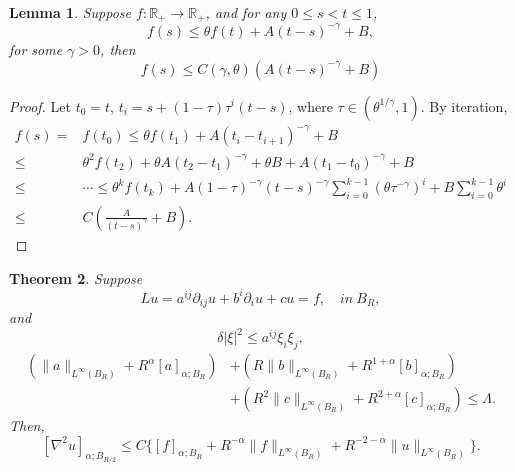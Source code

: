 \documentclass[twoside, 12pt]{book}
\numberwithin{equation}{chapter}
\newtheorem{theorem}{Theorem}[section]
\newtheorem{lemma}[theorem]{Lemma}
\def\mR{{\mathbb R}}
\def\leq{\leqslant}
\def\p{\partial}
\begin{document}
	\begin{lemma}\label{Le-Ele}
		Suppose $f: \mR_+ \to\mR_+$, and for any $0\leq s<t\leq 1$, 
		$$
		f(s)\leq \theta f(t)+ A(t-s)^{-\gamma} +B, 
		$$ 
		for some $\gamma>0$, then 
		\begin{equation}
			f(s)\leq C(\gamma, \theta) \left( A (t-s)^{-\gamma} +B\right)
		\end{equation}
	\end{lemma}
	\begin{proof}
		Let $t_0=t$, $t_i=s+(1-\tau)\tau^i (t-s)$, where $\tau\in (\theta^{1/\gamma},1)$. By iteration, 
		\begin{align*}
			f(s)=& f(t_{0})\leq \theta f(t_{1})+ A(t_{i}-t_{i+1})^{-\gamma}+B\\
			\leq & \theta^2 f(t_{2})+\theta A(t_{2}-t_1)^{-\gamma}+\theta B+A(t_{1}-t_{0})^{-\gamma}+B\\
			\leq&  \cdots \leq \theta^k f(t_k)+ A (1-\tau)^{-\gamma} (t-s)^{-\gamma} \sum_{i=0}^{k-1} (\theta \tau^{-\gamma})^i +B\sum_{i=0}^{k-1} \theta^i\\
			\leq &C\left(\frac{A}{(t-s)^\gamma}+B\right). 
		\end{align*}
		
	\end{proof}
	\begin{theorem}
		Suppose 
		\begin{equation}\label{Eq-2}
			Lu =a^{ij}\p_{ij} u+b^i \p_i u+cu=f, \quad \textit{in}\ B_R, 
		\end{equation}
		and 
		\begin{equation}
			\delta |\xi|^2\leq a^{ij}\xi_i\xi_j, 
		\end{equation}
		\begin{equation}
            \begin{aligned}
                (\|a\|_{L^\infty(B_R)}+ R^\alpha [a]_{\alpha; B_R})&+(R\|b\|_{L^\infty(B_R)}+ R^{1+\alpha} [b]_{\alpha; B_R})\\
                &+(R^2\|c\|_{L^\infty(B_R)}+ R^{2+\alpha} [c]_{\alpha; B_R}) \leq \Lambda.
            \end{aligned} 
		\end{equation}
		Then, 
		$$
		[\nabla^2 u]_{\alpha; B_{R/2}}\leq C \Big\{ [f]_{\alpha;B_R} +R^{-\alpha}\|f\|_{L^\infty(B_R)}+R^{-2-\alpha} \|u\|_{L^\infty(B_R)} \Big\}. 
		$$
	\end{theorem}
\end{document}
